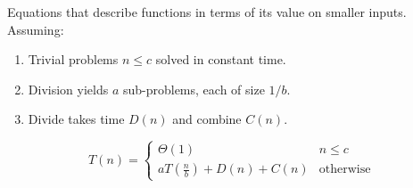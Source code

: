 \documentclass[twocolumn,english]{article}
\numberwithin{equation}{section}
\numberwithin{figure}{section}
\numberwithin{table}{section}
\begin{document}
Equations that describe functions in terms of its value on smaller
inputs. Assuming: 
\begin{enumerate}
\item Trivial problems $n\leq c$ solved in constant time. 
\item Division yields $a$ sub-problems, each of size $1/b$. 
\item Divide takes time $D\left(n\right)$ and combine $C\left(n\right)$. 
\end{enumerate}
\[
T\left(n\right)=\begin{cases}
\Theta\left(1\right) & n\leq c\\
aT\left(\frac{n}{b}\right)+D\left(n\right)+C\left(n\right) & \text{otherwise}
\end{cases}
\]
\end{document}
